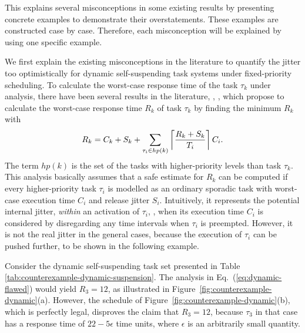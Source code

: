 
\label{sec:misconceptions}

This \mysectionrefnormal{} explains several misconceptions in some existing results by presenting concrete examples to demonstrate their overstatements. These examples are constructed case by case. Therefore, each misconception will be explained by using one specific example. 

\label{sec:wrong-jitter-dynamic}

We first explain the existing misconceptions in the literature to quantify the jitter too optimistically for dynamic self-suspending task systems under fixed-priority scheduling. To calculate the worst-case response time of the task $\tau_k$ under analysis, there have been several results in the literature, \ie, \cite{ECRTS-AudsleyB04,RTAS-AudsleyB04,RTCSA-KimCPKH95,MingLiRTCSA1994},  which propose to calculate the worst-case response time $R_k$ of task $\tau_k$ by finding the minimum $R_k$ with
\begin{equation}
R_k = C_k+ S_k+\sum_{\tau_i \in hp(k)}\left\lceil{\frac{R_k+S_k}{T_i}}\right\rceil C_i.
\label{eq:dynamic-flawed}
\end{equation}
The term $hp(k)$ is the set of the tasks with higher-priority levels than task $\tau_k$. 
This analysis basically assumes that a safe estimate for $R_k$ can be computed if
every higher-priority task $\tau_i$ is modelled as an ordinary sporadic
task with worst-case execution time $C_i$ and release jitter $S_i$.
Intuitively, it represents the potential internal jitter, \textit{within} an activation of $\tau_i$, \ie, when its execution time $C_i$ is considered by disregarding any time intervals when $\tau_i$ is preempted. 
However, it is not the real jitter in the general cases, because the execution of $\tau_i$ can be pushed further, to be shown in the following example.


Consider the dynamic self-suspending task set presented in Table \ref{tab:counterexample-dynamic-suspension}. 
The analysis in Eq.~(\ref{eq:dynamic-flawed}) would yield $R_3=12$, as illustrated in 
Figure~\ref{fig:counterexample-dynamic}(a). However, the schedule of Figure~\ref{fig:counterexample-dynamic}(b), which is perfectly legal, 
disproves the claim that $R_3=12$, because $\tau_3$ in that case has a response time of $22-5\epsilon$ time units, 
where $\epsilon$ is an arbitrarily small quantity. 

